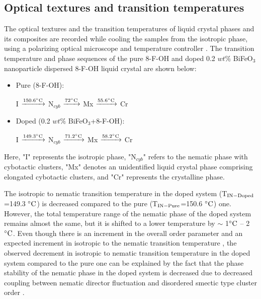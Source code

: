 \documentclass[reprint,amsfonts,amsmath,amssymb,aps,pre,floatfix,10pt]{revtex4-1}
\begin{document}
\subsection{Optical textures and transition temperatures}


The optical textures and the transition temperatures of liquid crystal phases and its composites are recorded while cooling the samples from the isotropic phase, using a polarizing optical microscope and temperature controller \cite{kumar2018quantum_10, khan2017elastic_11, kumar2018nanodoping_12}. The transition temperature and phase sequences of the pure 8-F-OH \cite{kaur2023polar} and doped 0.2 $wt\%$ BiFeO$_3$ nanoparticle dispersed 8-F-OH liquid crystal are shown below:
\begin{itemize}
\item Pure (8-F-OH): 

I $\xrightarrow{150.6 ^{\circ}{\rm C}}$  N$_{cyb}$ $\xrightarrow{72^{\circ}{\rm C}}$   Mx $\xrightarrow{55.6 ^{\circ}{\rm C}}$  Cr

\item Doped (0.2 $wt\%$ BiFeO$_3$+8-F-OH): 

I $\xrightarrow{149.3 ^{\circ}{\rm C}}$  N$_{cyb}$ $\xrightarrow{71.2 ^{\circ}{\rm C}}$  Mx $\xrightarrow{58.2 ^{\circ}{\rm C}}$ Cr
\end{itemize}
Here, "I" represents the isotropic phase, "N$_{cyb}$" refers to the nematic phase with cybotactic clusters, "Mx" denotes an unidentified liquid crystal phase comprising elongated cybotactic clusters, and "Cr" represents the crystalline phase.

The isotropic to nematic transition temperature in the doped system (T$_{\rm IN-Doped}$=149.3 $^{\circ}{\rm C}$) is decreased compared to the pure (T$_{\rm IN-Pure}$=150.6 $^{\circ}{\rm C}$) one. However, the total temperature range of the nematic phase of the doped system remains almost the same, but it is shifted to a lower temperature by $\sim$ 1$^{\circ}{\rm C}$ – 2$^{\circ}{\rm C}$. Even though there is an increment in the overall order parameter and an expected increment in isotropic to the nematic transition temperature \cite{lopatina2009theory_13}, the observed decrement in isotropic to nematic transition temperature in the doped system compared to the pure one can be explained by the fact that the phase stability of the nematic phase in the doped system is decreased due to decreased coupling between nematic director fluctuation and disordered smectic type cluster order \cite{mertelj2012critical}.
\end{document}
